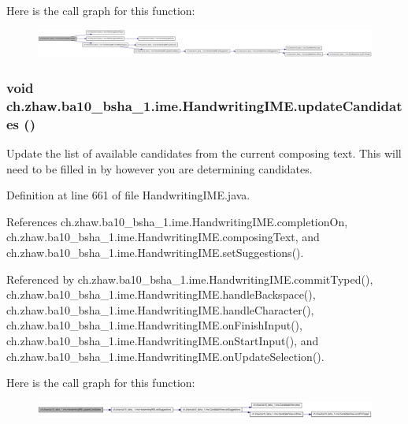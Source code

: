 Here is the call graph for this function:\nopagebreak
\begin{figure}[H]
\begin{center}
\leavevmode
\includegraphics[width=420pt]{classch_1_1zhaw_1_1ba10__bsha__1_1_1ime_1_1HandwritingIME_a788cf4563e1480f6c3ea3ca6f07b2623_cgraph}
\end{center}
\end{figure}
\hypertarget{classch_1_1zhaw_1_1ba10__bsha__1_1_1ime_1_1HandwritingIME_a428fc59e616bef0e75c866ddece97a70}{
\subsubsection[{updateCandidates}]{\setlength{\rightskip}{0pt plus 5cm}void ch.zhaw.ba10\_\-bsha\_\-1.ime.HandwritingIME.updateCandidates ()}}
\label{classch_1_1zhaw_1_1ba10__bsha__1_1_1ime_1_1HandwritingIME_a428fc59e616bef0e75c866ddece97a70}
Update the list of available candidates from the current composing text. This will need to be filled in by however you are determining candidates. 

Definition at line 661 of file HandwritingIME.java.

References ch.zhaw.ba10\_\-bsha\_\-1.ime.HandwritingIME.completionOn, ch.zhaw.ba10\_\-bsha\_\-1.ime.HandwritingIME.composingText, and ch.zhaw.ba10\_\-bsha\_\-1.ime.HandwritingIME.setSuggestions().

Referenced by ch.zhaw.ba10\_\-bsha\_\-1.ime.HandwritingIME.commitTyped(), ch.zhaw.ba10\_\-bsha\_\-1.ime.HandwritingIME.handleBackspace(), ch.zhaw.ba10\_\-bsha\_\-1.ime.HandwritingIME.handleCharacter(), ch.zhaw.ba10\_\-bsha\_\-1.ime.HandwritingIME.onFinishInput(), ch.zhaw.ba10\_\-bsha\_\-1.ime.HandwritingIME.onStartInput(), and ch.zhaw.ba10\_\-bsha\_\-1.ime.HandwritingIME.onUpdateSelection().

Here is the call graph for this function:\nopagebreak
\begin{figure}[H]
\begin{center}
\leavevmode
\includegraphics[width=420pt]{classch_1_1zhaw_1_1ba10__bsha__1_1_1ime_1_1HandwritingIME_a428fc59e616bef0e75c866ddece97a70_cgraph}
\end{center}
\end{figure}


